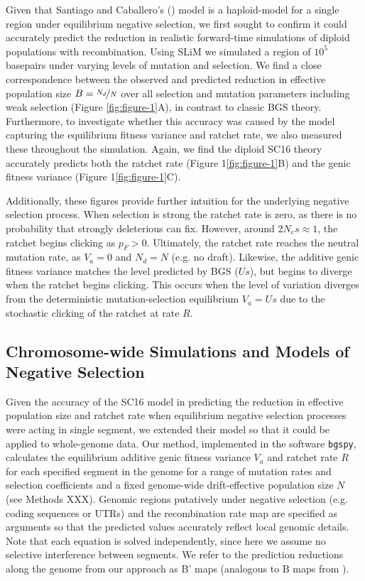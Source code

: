 \documentclass[11pt]{article}
\begin{document}
Given that Santiago and Caballero's (\citeyear{Santiago2016-mu}) model is a
haploid-model for a single region under equilibrium negative selection, we
first sought to confirm it could accurately predict the reduction in realistic
forward-time simulations of diploid populations with recombination. Using SLiM
\parencite{Haller2019-vu,Haller2023-uk} we simulated a region of $10^5$
basepairs under varying levels of mutation and selection. We find a close
correspondence between the observed and predicted reduction in effective
population size $B=\nicefrac{N_d}{N}$ over all selection and mutation
parameters including weak selection (Figure \ref{fig:figure-1}A), in contrast
to classic BGS theory. Furthermore, to investigate whether this accuracy was
caused by the model capturing the equilibrium fitness variance and ratchet
rate, we also measured these throughout the simulation. Again, we find the
diploid SC16 theory accurately predicts both the ratchet rate (Figure
1\ref{fig:figure-1}B) and the genic fitness variance (Figure
1\ref{fig:figure-1}C).

Additionally, these figures provide further intuition for the underlying
negative selection process. When selection is strong the ratchet rate is zero,
as there is no probability that strongly deleterious can fix. However, around
$2N_e s \approx 1$, the ratchet begins clicking as $p_F > 0$. Ultimately, the
ratchet rate reaches the neutral mutation rate, as $V_a = 0$ and $N_d = N$
(e.g. no draft). Likewise, the additive genic fitness variance matches the
level predicted by BGS ($Us$), but begins to diverge when the ratchet begins
clicking. This occurs when the level of variation diverges from the
deterministic mutation-selection equilibrium $V_a = Us$ due to the stochastic
clicking of the ratchet at rate $R$.

\subsection*{Chromosome-wide Simulations and Models of Negative Selection}

Given the accuracy of the SC16 model in predicting the reduction in effective
population size and ratchet rate when equilibrium negative selection processes
were acting in single segment, we extended their model so that it could be
applied to whole-genome data. Our method, implemented in the software
\texttt{bgspy}, calculates the equilibrium additive genic fitness variance
$V_a$ and ratchet rate $R$ for each specified segment in the genome for a range
of mutation rates and selection coefficients and a fixed genome-wide
drift-effective population size $N$ (see Methods XXX). Genomic regions
putatively under negative selection (e.g. coding sequences or UTRs) and the
recombination rate map are specified as arguments so that the predicted values
accurately reflect local genomic details. Note that each equation is solved
independently, since here we assume no selective interference between segments.
We refer to the prediction reductions along the genome from our approach as B'
maps (analogous to B maps from \cite{McVicker2009-ax}).
\end{document}
